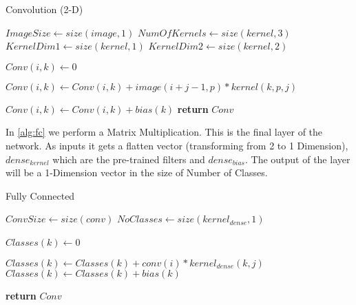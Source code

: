 \begin{algorithm}[H]
\caption{Convolution (2-D) }\label{alg:conv2}
\begin{algorithmic}[1]
\State $ImageSize\gets size(image,1)$ 
\State $NumOfKernels \gets size(kernel,3)$ 
\State $KernelDim1 \gets size(kernel,1)$ 
\State $KernelDim2 \gets size(kernel,2)$ 

\State $Conv(i,k)\gets 0$
\EndFor 

\EndFor {}     

\State $Conv(i,k)\gets Conv(i,k)+image(i+j-1,p)*kernel(k,p,j)$

\EndFor 
\EndFor 
\State $Conv(i,k)\gets Conv(i,k) + bias(k)$
\EndFor 
\EndFor 
\State \textbf{return} $Conv$       
\EndProcedure
\end{algorithmic}
\end{algorithm}

In \ref{alg:fc} we perform a Matrix Multiplication. This is the final layer of the network. As inputs it gets a flatten vector (transforming from 2 to 1 Dimension), $dense_{kernel}$ which are the pre-trained filters and $dense_{bias}$. The output of the layer will be a 1-Dimension vector in the size of Number of Classes.



\begin{algorithm}[H]
\caption{Fully Connected}\label{alg:fc}
\begin{algorithmic}[1]
\State $ConvSize\gets size(conv)$ 
\State $NoClasses \gets size(kernel_{dense},1)$ 

\State $Classes(k)\gets 0$
\EndFor 
\ 

       
\State $Classes(k)\gets Classes(k) + conv(i)*kernel_{dense}(k,j)$
\EndFor 
\State $Classes(k)\gets Classes(k) + bias(k)$
\EndFor 

\State \textbf{return} $Conv$       
\EndProcedure
\end{algorithmic}
\end{algorithm}

